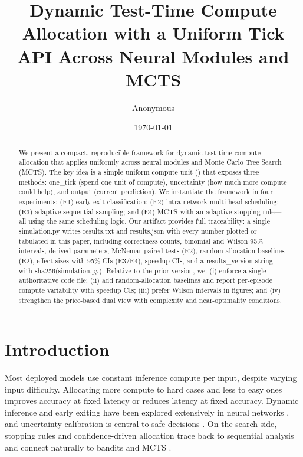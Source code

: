 \title{\vspace{-0.25em}\textbf{Dynamic Test-Time Compute Allocation with a Uniform Tick API Across Neural Modules and MCTS}\vspace{0.25em}}
\author{Anonymous}
\date{\today}


\maketitle

\begin{abstract}
We present a compact, reproducible framework for dynamic test-time compute allocation that applies uniformly across neural modules and Monte Carlo Tree Search (MCTS). The key idea is a simple uniform compute unit (\TickAPI) that exposes three methods: one\_tick (spend one unit of compute), uncertainty (how much more compute could help), and output (current prediction). We instantiate the framework in four experiments: (E1) early-exit classification; (E2) intra-network multi-head scheduling; (E3) adaptive sequential sampling; and (E4) MCTS with an adaptive stopping rule---all using the same scheduling logic. Our artifact provides full traceability: a single simulation.py writes results.txt and results.json with every number plotted or tabulated in this paper, including correctness counts, binomial and Wilson 95\% intervals, derived parameters, McNemar paired tests (E2), random-allocation baselines (E2), effect sizes with 95\% CIs (E3/E4), speedup CIs, and a results\_version string with sha256(simulation.py). Relative to the prior version, we: (i) enforce a single authoritative code file; (ii) add random-allocation baselines and report per-episode compute variability with speedup CIs; (iii) prefer Wilson intervals in figures; and (iv) strengthen the price-based dual view with complexity and near-optimality conditions.
\end{abstract}

\section{Introduction}
Most deployed models use constant inference compute per input, despite varying input difficulty. Allocating more compute to hard cases and less to easy ones improves accuracy at fixed latency or reduces latency at fixed accuracy. Dynamic inference and early exiting have been explored extensively in neural networks \cite{Graves2016ACT,Teerapittayanon2016BranchyNet,Huang2018MSDNet,Wang2018SkipNet,Kaya2019ShallowDeep,Xin2020DeeBERT,Liu2020FastBERT,Elbayad2020DepthAdaptive,NiculescuMizil2005Calib,Figurnov2017SACT,Bolukbasi2017Adaptive,Cai2020OFA,Xiao2021DynamicViT,Ryoo2021TokenLearner,Yu2019Slimmable,Guo2017Calibration}, and uncertainty calibration is central to safe decisions \cite{Guo2017Calibration,Kendall2017Uncertainty,Gal2016DropoutBayes,Platt1999}. On the search side, stopping rules and confidence-driven allocation trace back to sequential analysis \cite{Wald1945Sequential,Hoeffding1963} and connect naturally to bandits and MCTS \cite{Kocsis2006UCT,Coulom2006MCTS,Silver2017AlphaZero,Schrittwieser2020MuZero,LattimoreSzepesvari2020,Kalyanakrishnan2012PAC,Anthony2017ThinkingFast}. 


